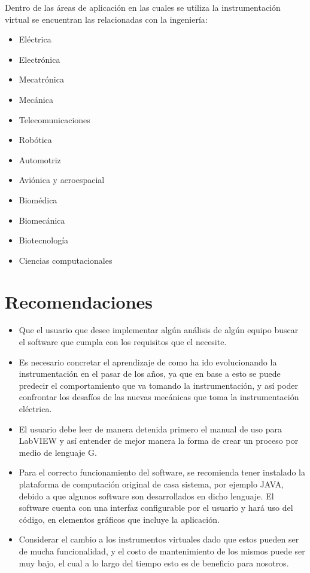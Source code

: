 \documentclass[12pt,letterpaper, onecolumn, titlepage, oneside]{book}
\begin{document}
Dentro de las áreas de aplicación en las cuales se utiliza la instrumentación virtual se encuentran las relacionadas con la ingeniería:
\begin{itemize}
    \item Eléctrica
    \item Electrónica
    \item Mecatrónica
    \item Mecánica
    \item Telecomunicaciones
    \item Robótica
    \item Automotriz
    \item Aviónica y aeroespacial
    \item Biomédica
    \item Biomecánica
    \item Biotecnología
    \item Ciencias computacionales
\end{itemize}


\backmatter
\chapter{Recomendaciones}



\begin{itemize}


\item Que el usuario que desee implementar algún análisis de algún equipo buscar el software que cumpla con los requisitos que el necesite.
\item Es necesario concretar el aprendizaje de como ha ido evolucionando la instrumentación en el pasar de los años, ya que en base a esto se puede predecir el comportamiento que va tomando la instrumentación, y así poder confrontar los desafíos de las nuevas mecánicas que toma la instrumentación eléctrica.
\item El usuario debe leer de manera detenida primero el manual de uso para LabVIEW y así entender de mejor manera la forma de crear un proceso por medio de lenguaje G.
\item Para el correcto funcionamiento del software, se recomienda tener instalado la plataforma de computación original de casa sistema, por ejemplo JAVA, debido a que algunos software son desarrollados en dicho lenguaje. El software cuenta con una interfaz configurable por el usuario y hará uso del código, en elementos gráficos que incluye la aplicación.

\item Considerar el cambio a los instrumentos virtuales dado que estos pueden ser de mucha funcionalidad, y el costo de mantenimiento de los mismos puede ser muy bajo, el cual a lo largo del tiempo esto es de beneficio para nosotros. 

\end{itemize}
\end{document}
